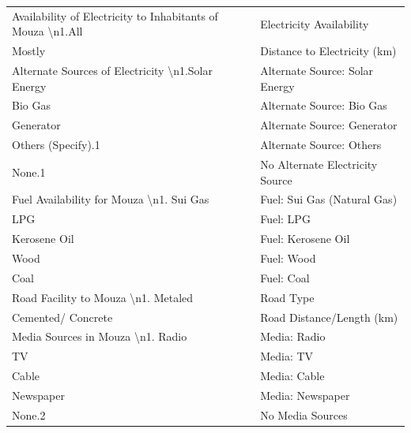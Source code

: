 \documentclass[10pt,a4paper]{article}
\begin{document}
\begin{longtable}{>{\raggedright\arraybackslash}p{7.5cm} >{\raggedright\arraybackslash}p{7.5cm}}
Availability of Electricity to Inhabitants of Mouza \textbackslash n1.All & Electricity Availability \\
Mostly & Distance to Electricity (km) \\

Alternate Sources of Electricity \textbackslash n1.Solar Energy & Alternate Source: Solar Energy \\
Bio Gas & Alternate Source: Bio Gas \\
Generator & Alternate Source: Generator \\
Others (Specify).1 & Alternate Source: Others \\
None.1 & No Alternate Electricity Source \\

Fuel Availability for Mouza \textbackslash n1. Sui Gas & Fuel: Sui Gas (Natural Gas) \\
LPG & Fuel: LPG \\
Kerosene Oil & Fuel: Kerosene Oil \\
Wood & Fuel: Wood \\
Coal & Fuel: Coal \\

Road Facility to Mouza \textbackslash n1. Metaled & Road Type \\
Cemented/ Concrete & Road Distance/Length (km) \\

Media Sources in Mouza \textbackslash n1. Radio & Media: Radio \\
TV & Media: TV \\
Cable & Media: Cable \\
Newspaper & Media: Newspaper \\
None.2 & No Media Sources \\

\end{longtable}
\end{document}
